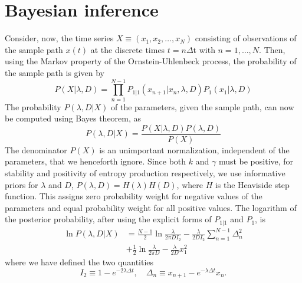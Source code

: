 \documentclass[english,aps, twocolumn, pre,superscriptaddress]{revtex4-1}
\begin{document}
\section{Bayesian inference\label{sec:Bayesian-inference}}

Consider, now, the time series $X\equiv(x_{1},x_{2},\ldots,x_{N})$
consisting of observations of the sample path $x(t)$ at the discrete
times $t=n\Delta$t with $n=1,\ldots,N.$ Then, using the Markov property
of the Ornstein-Uhlenbeck process, the probability of the sample path
is given by \cite{wang1945theory} 
\begin{equation}
P(X|\lambda,D)=\prod_{n=1}^{N-1}P_{1|1}(x_{n+1}|x_{n},\lambda,D)P_{1}(x_{1}|\lambda,D)
\end{equation}
The probability $P(\lambda,D|X)$ of the parameters, given the sample
path, can now be computed using Bayes theorem, as
\[
P(\lambda,D|X)=\frac{P(X|\lambda,D)P(\lambda,D)}{P(X)}
\]
The denominator $P(X)$ is an unimportant normalization, independent
of the parameters, that we henceforth ignore. Since both $k$ and
$\gamma$ must be positive, for stability and positivity of entropy
production respectively, we use informative priors for $\lambda$
and $D$, $P(\lambda,D)=H(\lambda)H(D)$, where $H$ is the Heaviside
step function. This assigns zero probability weight for negative values
of the parameters and equal probability weight for all positive values.
The logarithm of the posterior probability, after using the explicit
forms of $P_{1|1}$ and $P_{1}$, is
\begin{align}
\ln P(\lambda,D|X) & =\frac{N-1}{2}\ln\frac{\lambda}{2\pi DI_{2}}-\frac{\lambda}{2DI_{2}}\sum_{n=1}^{N-1}\Delta_{n}^{2}\nonumber \\
 & +\frac{1}{2}\ln\frac{\lambda}{2\pi D}-\frac{\lambda}{2D}x_{1}^{2}\label{eq:joint-posterior}
\end{align}
where we have defined the two quantities 
\[
I_{2}\equiv1-e^{-2\lambda\Delta t},\quad\Delta_{n}\equiv x_{n+1}-e^{-\lambda\Delta t}x_{n}.
\]
\end{document}
